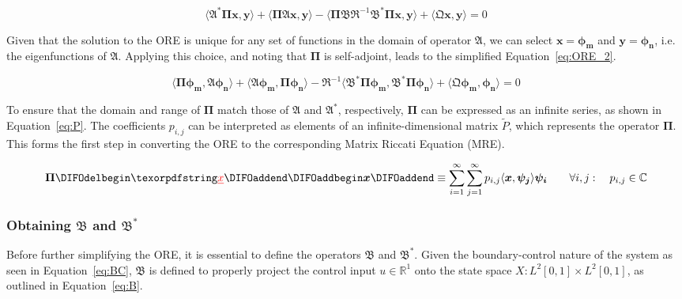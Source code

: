 \begin{equation} \label{eq:ORE_1}
    \langle \mathfrak{A}^* \mathbf{\Pi} \bm{x}, \bm{y}\rangle + \langle \mathbf{\Pi} \mathfrak{A} \bm{x}, \bm{y} \rangle - \langle \mathbf{\Pi} \mathfrak{B} \mathfrak{R}^{-1} \mathfrak{B}^* \mathbf{\Pi} \bm{x}, \bm{y}\rangle + \langle \mathfrak{Q} \bm{x}, \bm{y}\rangle = 0
\end{equation}

Given that the solution to the ORE is unique for any set of functions in the domain of operator $\mathfrak{A}$, we can select $\bm{x} = \bm{\phi_m}$ and $\bm{y} = \bm{\phi_n}$, i.e. the eigenfunctions of $\mathfrak{A}$. Applying this choice, and noting that $\mathbf{\Pi}$ is self-adjoint, leads to the simplified Equation~\ref{eq:ORE_2}.

\begin{equation} \label{eq:ORE_2}
    \langle \mathbf{\Pi} \bm{\phi_m}, \mathfrak{A} \bm{\phi_n} \rangle
    + \langle \mathfrak{A} \bm{\phi_m}, \mathbf{\Pi} \bm{\phi_n} \rangle
    - \mathfrak{R}^{-1} \langle \mathfrak{B}^* \mathbf{\Pi} \bm{\phi_m}, \mathfrak{B}^* \mathbf{\Pi} \bm{\phi_n} \rangle 
    + \langle \mathfrak{Q} \bm{\phi_m}, \bm{\phi_n} \rangle = 0
\end{equation}

To ensure that the domain and range of $\mathbf{\Pi}$ match those of $\mathfrak{A}$ and $\mathfrak{A}^*$, respectively, $\mathbf{\Pi}$ can be expressed as an infinite series, as shown in Equation~\ref{eq:P}. The coefficients $p_{i,j}$ can be interpreted as elements of an infinite-dimensional matrix $\tilde{P}$, which represents the operator $\mathbf{\Pi}$. This forms the first step in converting the ORE to the corresponding Matrix Riccati Equation (MRE).

\begin{equation} \label{eq:P}
    \mathbf{\Pi} \DIFdelbegin \DIFdel{x }\DIFdelend \DIFaddbegin \bm{x} \DIFaddend \equiv \sum_{i=1}^{\infty}\sum_{j=1}^{\infty} p_{i,j} \langle \bm{x}, \bm{\psi_j} \rangle \bm{\psi_i} \qquad
    \forall {i,j}: \quad p_{i,j} \in \mathbb{C}
\end{equation}

\subsubsection{Obtaining $\mathfrak{B}$ and $\mathfrak{B}^*$}

Before further simplifying the ORE, it is essential to define the operators $\mathfrak{B}$ and $\mathfrak{B}^*$. Given the boundary-control nature of the system as seen in Equation~\ref{eq:BC}, $\mathfrak{B}$ is defined to properly project the control input $u \in \mathbb{R}^1$ onto the state space $X: L^2[0,1] \times L^2[0,1]$, as outlined in Equation~\ref{eq:B}.

